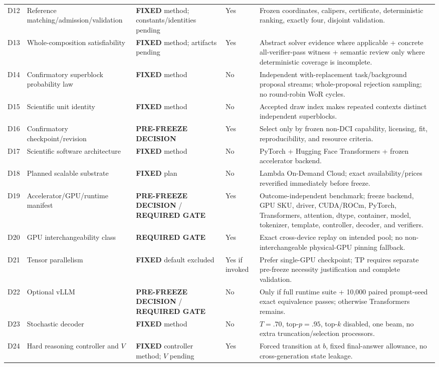 \documentclass[11pt,a4paper]{article}
\newcommand{\FIXED}{\textbf{FIXED}}
\newcommand{\PFD}{\textbf{PRE-FREEZE DECISION}}
\newcommand{\GATE}{\textbf{REQUIRED GATE}}
\begin{document}
\begin{longtable}{p{}p{}p{}p{}p{}}
D12 & Reference matching/admission/validation & \FIXED{} method; constants/identities pending & Yes & Frozen coordinates, calipers, certificate, deterministic ranking, exactly four, disjoint validation. \\
D13 & Whole-composition satisfiability & \FIXED{} method; artifacts pending & Yes & Abstract solver evidence where applicable + concrete all-verifier-pass witness + semantic review only where deterministic coverage is incomplete. \\
D14 & Confirmatory superblock probability law & \FIXED{} method & No & Independent with-replacement task/background proposal streams; whole-proposal rejection sampling; no round-robin WoR cycles. \\
D15 & Scientific unit identity & \FIXED{} method & No & Accepted draw index makes repeated contexts distinct independent superblocks. \\
D16 & Confirmatory checkpoint/revision & \PFD{} & Yes & Select only by frozen non-DCI capability, licensing, fit, reproducibility, and resource criteria. \\
D17 & Scientific software architecture & \FIXED{} method & No & PyTorch + Hugging Face Transformers + frozen accelerator backend. \\
D18 & Planned scalable substrate & \FIXED{} plan & No & Lambda On-Demand Cloud; exact availability/prices reverified immediately before freeze. \\
D19 & Accelerator/GPU/runtime manifest & \PFD{} / \GATE{} & Yes & Outcome-independent benchmark; freeze backend, GPU SKU, driver, CUDA/ROCm, PyTorch, Transformers, attention, dtype, container, model, tokenizer, template, controller, decoder, and verifiers. \\
D20 & GPU interchangeability class & \GATE{} & Yes & Exact cross-device replay on intended pool; no non-interchangeable physical-GPU pinning fallback. \\
D21 & Tensor parallelism & \FIXED{} default excluded & Yes if invoked & Prefer single-GPU checkpoint; TP requires separate pre-freeze necessity justification and complete validation. \\
D22 & Optional vLLM & \PFD{} / \GATE{} & No & Only if full runtime suite + 10,000 paired prompt-seed exact equivalence passes; otherwise Transformers remains. \\
D23 & Stochastic decoder & \FIXED{} method & No & $T=.70$, top-$p=.95$, top-$k$ disabled, one beam, no extra truncation/selection processors. \\
D24 & Hard reasoning controller and $V$ & \FIXED{} controller method; $V$ pending & Yes & Forced transition at $b$, fixed final-answer allowance, no cross-generation state leakage. \\

\end{longtable}
\end{document}
